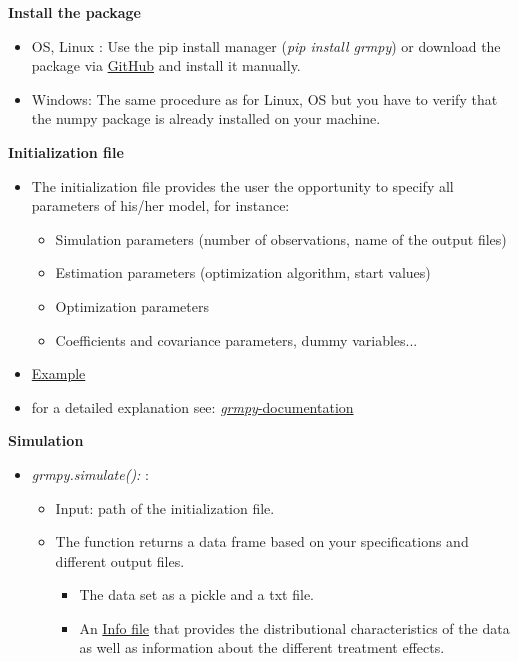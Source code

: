 \begin{frame}
\textbf{Install the package}
\begin{itemize}\setlength\itemsep{1em}
\item OS, Linux : Use the pip install manager (\textit{pip install grmpy}) or download the package via \href{https://github.com/grmToolbox/grmpy}{GitHub} and install it manually.
\item Windows:  The same procedure as for Linux, OS but you have to verify that the numpy package is already installed on your machine.
\end{itemize}
\end{frame}

\begin{frame}
\textbf{Initialization file}
\begin{itemize}\setlength\itemsep{1em}
\item The initialization file provides the user the opportunity to specify all parameters of his/her model, for instance:\medskip
  \begin{itemize}\setlength\itemsep{1em}
  \item Simulation parameters (number of observations, name of the output files)
  \item Estimation parameters (optimization algorithm, start values)
  \item Optimization parameters
  \item Coefficients and covariance parameters, dummy variables...
  \end{itemize}
\item \href{../material/05_grmpy_tutorial/application/tutorial.grmpy.ini}{Example}
\item for a detailed explanation see: \href{http://grmpy.readthedocs.io/en/latest/tutorial.html}{\textit{grmpy}-documentation}
\end{itemize}
\end{frame}

\begin{frame}
\textbf{Simulation}
\begin{itemize}\setlength\itemsep{1em}
\item \textit{grmpy.simulate():} :\medskip
\begin{itemize}\setlength\itemsep{1em}
\item Input: path of the initialization file.
\item The function returns a data frame based on your specifications and different output files.
\begin{itemize}\setlength\itemsep{1em}
\item The data set as a pickle and a txt file.
\item An \href{../material/05_grmpy_tutorial/examples/data.grmpy.info}{Info file} that provides the distributional characteristics of the data as well as information about the different treatment effects.
\end{itemize}

\end{itemize}
\end{itemize}
\end{frame}

